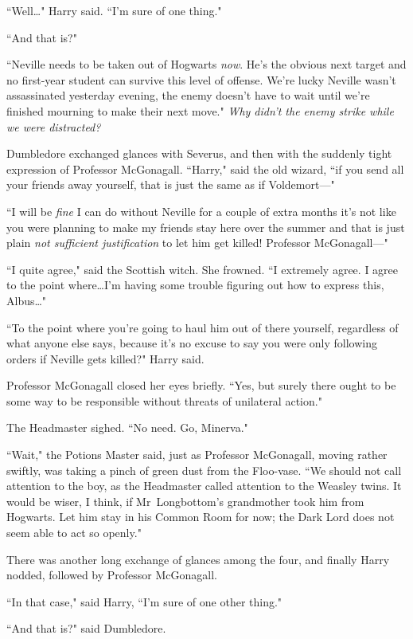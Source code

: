 ``Well…" Harry said. ``I'm sure of one thing."

``And that is?"

``Neville needs to be taken out of Hogwarts \emph{now}. He's the obvious next target and no first-year student can survive this level of offense. We're lucky Neville wasn't assassinated yesterday evening, the enemy doesn't have to wait until we're finished mourning to make their next move." \emph{Why didn't the enemy strike while we were distracted?}

Dumbledore exchanged glances with Severus, and then with the suddenly tight expression of Professor McGonagall. ``Harry," said the old wizard, ``if you send all your friends away yourself, that is just the same as if Voldemort—"

``I will be \emph{fine} I can do without Neville for a couple of extra months it's not like you were planning to make my friends stay here over the summer and that is just plain \emph{not sufficient justification} to let him get killed! Professor McGonagall—"

``I quite agree," said the Scottish witch. She frowned. ``I extremely agree. I agree to the point where…I'm having some trouble figuring out how to express this, Albus…"

``To the point where you're going to haul him out of there yourself, regardless of what anyone else says, because it's no excuse to say you were only following orders if Neville gets killed?" Harry said.

Professor McGonagall closed her eyes briefly. ``Yes, but surely there ought to be some way to be responsible without threats of unilateral action."

The Headmaster sighed. ``No need. Go, Minerva."

``Wait," the Potions Master said, just as Professor McGonagall, moving rather swiftly, was taking a pinch of green dust from the Floo-vase. ``We should not call attention to the boy, as the Headmaster called attention to the Weasley twins. It would be wiser, I think, if Mr~Longbottom's grandmother took him from Hogwarts. Let him stay in his Common Room for now; the Dark Lord does not seem able to act so openly."

There was another long exchange of glances among the four, and finally Harry nodded, followed by Professor McGonagall.

``In that case," said Harry, ``I'm sure of one other thing."

``And that is?" said Dumbledore.

